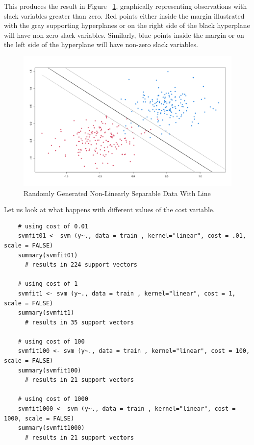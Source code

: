 \documentclass[12pt]{article}
\begin{document}
This produces the result in Figure ~\ref{fig_svc_data_w_hyperplanes}, graphically representing observations with slack variables greater than zero. Red points either inside the margin illustrated with the gray supporting hyperplanes or on the right side of the black hyperplane will have non-zero slack variables. Similarly, blue points inside the margin or on the left side of the hyperplane will have non-zero slack variables.

\begin{figure}[ht]
    \centering
    \includegraphics[width=5in]{Figures/svc/svc_data_w_hyperplanes.png}
    \caption{Randomly Generated Non-Linearly Separable Data With Line}
    \label{fig_svc_data_w_hyperplanes}
\end{figure}

Let us look at what happens with different values of the cost variable.

\begin{verbatim}
    # using cost of 0.01
    svmfit01 <- svm (y~., data = train , kernel="linear", cost = .01, scale = FALSE)
    summary(svmfit01)
      # results in 224 support vectors
    
    # using cost of 1
    svmfit1 <- svm (y~., data = train , kernel="linear", cost = 1, scale = FALSE)
    summary(svmfit1)
      # results in 35 support vectors
    
    # using cost of 100
    svmfit100 <- svm (y~., data = train , kernel="linear", cost = 100, scale = FALSE)
    summary(svmfit100)
      # results in 21 support vectors
    
    # using cost of 1000
    svmfit1000 <- svm (y~., data = train , kernel="linear", cost = 1000, scale = FALSE)
    summary(svmfit1000)
      # results in 21 support vectors
\end{verbatim}
\end{document}
